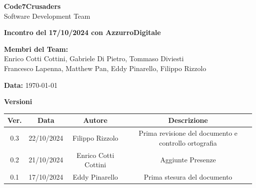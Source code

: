 \documentclass{article}
\begin{document}
\begin{titlepage}
    {\Huge \textbf{Code7Crusaders}}\\
    \vspace{0.5cm}
    {\Large Software Development Team}\\
    \vspace{2cm}
    
    {\large \textbf{Incontro del 17/10/2024 con AzzurroDigitale}}\\
    \vspace{5cm}

    \textbf{Membri del Team:}\\
    Enrico Cotti Cottini, Gabriele Di Pietro, Tommaso Diviesti \\
    Francesco Lapenna, Matthew Pan, Eddy Pinarello, Filippo Rizzolo \\
    \vspace{0.5cm}
    
    {\large \textbf{Data:}} \today\\
    
    \vspace{1cm}
\end{titlepage}

\tableofcontents
\newpage

\begin{center}
    \textbf{Versioni} %
    \\
    \begin{tabular}{|c|c|c|c|}
        \hline
        \textbf{Ver.} & \textbf{Data} & \textbf{Autore} & \textbf{Descrizione} \\
        \hline
        0.3 & 22/10/2024 & Filippo Rizzolo & Prima revisione del documento e controllo ortografia \\ 
        \hline
        0.2 & 21/10/2024 & Enrico Cotti Cottini & Aggiunte Presenze \\
        \hline
        0.1 & 17/10/2024 & Eddy Pinarello & Prima stesura del documento  \\ 
        \hline
    \end{tabular}
\end{center}

\newpage
\end{document}
